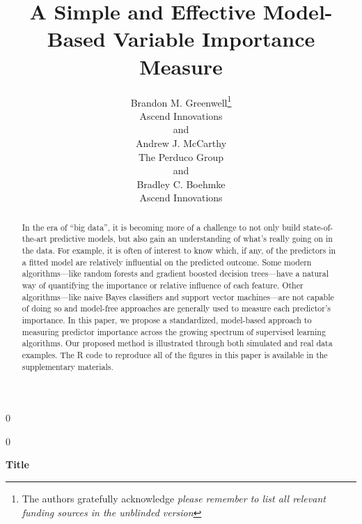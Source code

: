 \documentclass[12pt]{article}
\newcommand{\blind}{0}
\begin{document}
%

\def\spacingset#1{\renewcommand{\baselinestretch}%
{#1}\small\normalsize} \spacingset{1}



\blind
{
  \title{\bf A Simple and Effective Model-Based Variable Importance Measure}
  \author{Brandon M. Greenwell\thanks{
    The authors gratefully acknowledge \textit{please remember to list all relevant funding sources in the unblinded version}}\hspace{.2cm}\\
    Ascend Innovations           \\
    and \\
    Andrew J. McCarthy \\
    The Perduco Group \\
    and \\
    Bradley C. Boehmke \\
    Ascend Innovations}
  \maketitle
} \fi

\blind
{
  \bigskip
  \bigskip
  \bigskip
  \begin{center}
    {\LARGE\bf Title}
\end{center}
  \medskip
} \fi

\bigskip
\begin{abstract}
In the era of ``big data'', it is becoming more of a challenge to not only build state-of-the-art predictive models, but also gain an understanding of what's really going on in the data. For example, it is often of interest to know which, if any, of the predictors in a fitted model are relatively influential on the predicted outcome. Some modern algorithms---like random forests and gradient boosted decision trees---have a natural way of quantifying the importance or relative influence of each feature. Other algorithms---like naive Bayes classifiers and support vector machines---are not capable of doing so and model-free approaches are generally used to measure each predictor's importance. In this paper, we propose a standardized, model-based approach to measuring predictor importance across the growing spectrum of supervised learning algorithms. Our proposed method is illustrated through both simulated and real data examples. The R code to reproduce all of the figures in this paper is available in the supplementary materials.
\end{abstract}
\end{document}
